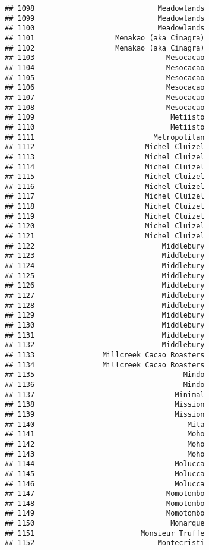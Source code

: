\documentclass[
]{article}
\begin{document}
\begin{verbatim}
## 1098                             Meadowlands
## 1099                             Meadowlands
## 1100                             Meadowlands
## 1101                   Menakao (aka Cinagra)
## 1102                   Menakao (aka Cinagra)
## 1103                               Mesocacao
## 1104                               Mesocacao
## 1105                               Mesocacao
## 1106                               Mesocacao
## 1107                               Mesocacao
## 1108                               Mesocacao
## 1109                                Metiisto
## 1110                                Metiisto
## 1111                            Metropolitan
## 1112                          Michel Cluizel
## 1113                          Michel Cluizel
## 1114                          Michel Cluizel
## 1115                          Michel Cluizel
## 1116                          Michel Cluizel
## 1117                          Michel Cluizel
## 1118                          Michel Cluizel
## 1119                          Michel Cluizel
## 1120                          Michel Cluizel
## 1121                          Michel Cluizel
## 1122                              Middlebury
## 1123                              Middlebury
## 1124                              Middlebury
## 1125                              Middlebury
## 1126                              Middlebury
## 1127                              Middlebury
## 1128                              Middlebury
## 1129                              Middlebury
## 1130                              Middlebury
## 1131                              Middlebury
## 1132                              Middlebury
## 1133                Millcreek Cacao Roasters
## 1134                Millcreek Cacao Roasters
## 1135                                   Mindo
## 1136                                   Mindo
## 1137                                 Minimal
## 1138                                 Mission
## 1139                                 Mission
## 1140                                    Mita
## 1141                                    Moho
## 1142                                    Moho
## 1143                                    Moho
## 1144                                 Molucca
## 1145                                 Molucca
## 1146                                 Molucca
## 1147                               Momotombo
## 1148                               Momotombo
## 1149                               Momotombo
## 1150                                Monarque
## 1151                         Monsieur Truffe
## 1152                             Montecristi

\end{verbatim}
\end{document}
